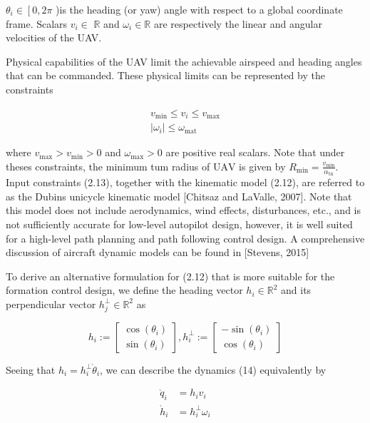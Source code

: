 \documentclass[10pt]{article}
\begin{document}
$\theta_{i} \in\left[0,2 \pi\right.$ )is the heading (or yaw) angle with respect to a global coordinate frame. Scalars $v_{i} \in$ $\mathbb{R}$ and $\omega_{i} \in \mathbb{R}$ are respectively the linear and angular velocities of the UAV.

Physical capabilities of the UAV limit the achievable airspeed and heading angles that can be commanded. These physical limits can be represented by the constraints

$$
\begin{array}{r}
v_{\min } \leq v_{i} \leq v_{\max } \\
\left|\omega_{i}\right| \leq \omega_{\text {mat }}
\end{array}
$$

where $v_{\max }>v_{\min }>0$ and $\omega_{\max }>0$ are positive real scalars. Note that under theses constraints, the minimum tum radius of $\mathrm{UAV}$ is given by $R_{\min }=\frac{v_{\min }}{\alpha_{\mathrm{tn}}}$. Input constraints (2.13), together with the kinematic model (2.12), are referred to as the Dubins unicycle kinematic model [Chitsaz and LaValle, 2007]. Note that this model does not include aerodynamics, wind effects, disturbances, etc., and is not sufficiently accurate for low-level autopilot design, however, it is well suited for a high-level path planning and path following control design. A comprehensive discussion of aircraft dynamic models can be found in [Stevens, 2015]

To derive an alternative formulation for (2.12) that is more suitable for the formation control design, we define the heading vector $h_{i} \in \mathbb{R}^{2}$ and its perpendicular vector $h_{j}^{\perp} \in \mathbb{R}^{2}$ as

$$
h_{i}:=\left[\begin{array}{c}
\cos \left(\theta_{i}\right) \\
\sin \left(\theta_{i}\right)
\end{array}\right], h_{i}^{\perp}:=\left[\begin{array}{c}
-\sin \left(\theta_{i}\right) \\
\cos \left(\theta_{i}\right)
\end{array}\right]
$$

Seeing that $h_{i}=h_{i}^{\perp} \grave{\theta}_{i}$, we can describe the dynamics (14) equivalently by

$$
\begin{aligned}
\grave{q}_{i} & =h_{i} v_{i} \\
\grave{h}_{i} & =h_{i}^{\perp} \omega_{i}
\end{aligned}
$$
\end{document}
